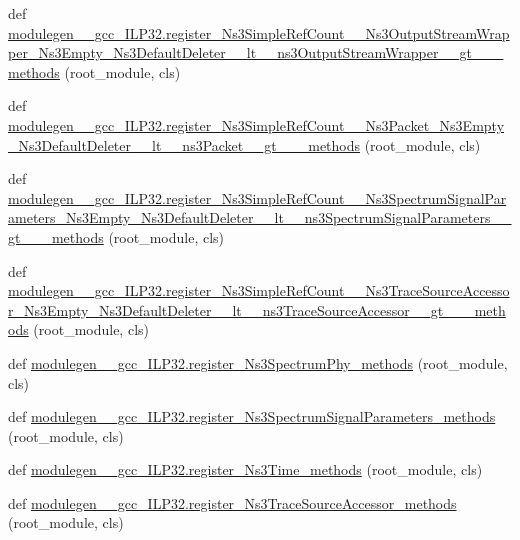 \begin{DoxyCompactItemize}
\item 
def \hyperlink{namespacemodulegen____gcc__ILP32_a4d1d8838713af407eb5e2cdb71da8b0b}{modulegen\+\_\+\+\_\+gcc\+\_\+\+I\+L\+P32.\+register\+\_\+\+Ns3\+Simple\+Ref\+Count\+\_\+\+\_\+\+Ns3\+Output\+Stream\+Wrapper\+\_\+\+Ns3\+Empty\+\_\+\+Ns3\+Default\+Deleter\+\_\+\+\_\+lt\+\_\+\+\_\+ns3\+Output\+Stream\+Wrapper\+\_\+\+\_\+gt\+\_\+\+\_\+\+\_\+methods} (root\+\_\+module, cls)
\item 
def \hyperlink{namespacemodulegen____gcc__ILP32_a0ef742c28dd795a6ce9adfeac1b275b8}{modulegen\+\_\+\+\_\+gcc\+\_\+\+I\+L\+P32.\+register\+\_\+\+Ns3\+Simple\+Ref\+Count\+\_\+\+\_\+\+Ns3\+Packet\+\_\+\+Ns3\+Empty\+\_\+\+Ns3\+Default\+Deleter\+\_\+\+\_\+lt\+\_\+\+\_\+ns3\+Packet\+\_\+\+\_\+gt\+\_\+\+\_\+\+\_\+methods} (root\+\_\+module, cls)
\item 
def \hyperlink{namespacemodulegen____gcc__ILP32_a7962799a19e75dcb6ec74f8c2baba69b}{modulegen\+\_\+\+\_\+gcc\+\_\+\+I\+L\+P32.\+register\+\_\+\+Ns3\+Simple\+Ref\+Count\+\_\+\+\_\+\+Ns3\+Spectrum\+Signal\+Parameters\+\_\+\+Ns3\+Empty\+\_\+\+Ns3\+Default\+Deleter\+\_\+\+\_\+lt\+\_\+\+\_\+ns3\+Spectrum\+Signal\+Parameters\+\_\+\+\_\+gt\+\_\+\+\_\+\+\_\+methods} (root\+\_\+module, cls)
\item 
def \hyperlink{namespacemodulegen____gcc__ILP32_a54ea4c3c62de90cf295c66cffbc336c8}{modulegen\+\_\+\+\_\+gcc\+\_\+\+I\+L\+P32.\+register\+\_\+\+Ns3\+Simple\+Ref\+Count\+\_\+\+\_\+\+Ns3\+Trace\+Source\+Accessor\+\_\+\+Ns3\+Empty\+\_\+\+Ns3\+Default\+Deleter\+\_\+\+\_\+lt\+\_\+\+\_\+ns3\+Trace\+Source\+Accessor\+\_\+\+\_\+gt\+\_\+\+\_\+\+\_\+methods} (root\+\_\+module, cls)
\item 
def \hyperlink{namespacemodulegen____gcc__ILP32_ad6fca783b6d7a9230765d58c3be64bb4}{modulegen\+\_\+\+\_\+gcc\+\_\+\+I\+L\+P32.\+register\+\_\+\+Ns3\+Spectrum\+Phy\+\_\+methods} (root\+\_\+module, cls)
\item 
def \hyperlink{namespacemodulegen____gcc__ILP32_a2e85afaa4e4adf504485b30e2b7c7ba6}{modulegen\+\_\+\+\_\+gcc\+\_\+\+I\+L\+P32.\+register\+\_\+\+Ns3\+Spectrum\+Signal\+Parameters\+\_\+methods} (root\+\_\+module, cls)
\item 
def \hyperlink{namespacemodulegen____gcc__ILP32_a4bcbbf479533e8b6fb238739668fe36d}{modulegen\+\_\+\+\_\+gcc\+\_\+\+I\+L\+P32.\+register\+\_\+\+Ns3\+Time\+\_\+methods} (root\+\_\+module, cls)
\item 
def \hyperlink{namespacemodulegen____gcc__ILP32_a3451d08858386f1fa04131d165c83ba0}{modulegen\+\_\+\+\_\+gcc\+\_\+\+I\+L\+P32.\+register\+\_\+\+Ns3\+Trace\+Source\+Accessor\+\_\+methods} (root\+\_\+module, cls)

\end{DoxyCompactItemize}
